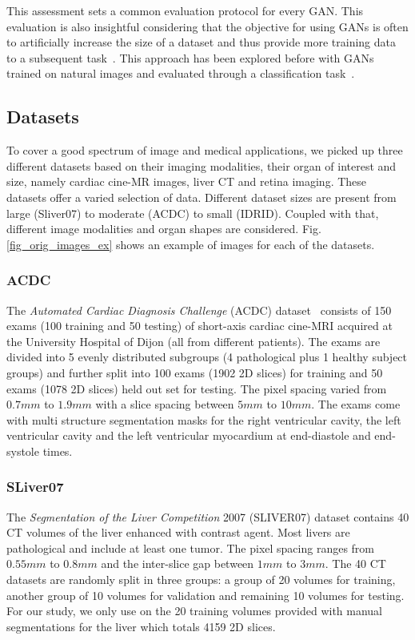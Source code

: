 \documentclass[preprint,12pt, authoryear]{elsarticle}
\begin{document}
This assessment sets a common evaluation protocol for every GAN.  This evaluation is also insightful considering that the objective for using GANs is often to artificially increase the size of a dataset and thus provide more training data to a subsequent task~\citep{Skandarani2020OnTE, Shin2018MedicalIS}. This approach has been explored before with GANs trained on natural images and evaluated through a classification task~\citep{Ravuri2019ClassificationAS,Shmelkov2018HowGI}.

\subsection{Datasets}

To cover a good spectrum of image and medical applications, we picked up three different datasets based on their imaging modalities, their organ of interest and size, namely cardiac cine-MR images, liver CT and retina imaging. These datasets offer a varied selection of data. Different dataset sizes are present from large (Sliver07) to moderate (ACDC) to small (IDRID). Coupled with that, different image modalities and organ shapes are considered. Fig. \ref{fig_orig_images_ex} shows an example of images for each of the datasets.
\subsubsection{ACDC}
The {\em Automated Cardiac Diagnosis Challenge} (ACDC) dataset~\citep{bernard2018deep} consists of 150 exams (100 training and 50 testing) of short-axis cardiac cine-MRI acquired at the University Hospital of Dijon (all from different patients).  The exams are divided into 5 evenly distributed subgroups (4 pathological plus 1 healthy subject groups) and further split into 100 exams (1902 2D slices) for training and 50 exams (1078 2D slices) held out set for testing. The pixel spacing varied from $0.7 mm$ to $1.9 mm$ with a slice spacing between $5 mm$ to $10 mm$. The exams come with multi structure segmentation masks for the right ventricular cavity, the left ventricular cavity and the left ventricular myocardium at end-diastole and end-systole times.
\subsubsection{SLiver07}
The {\em Segmentation of the Liver Competition} 2007 (SLIVER07) \citep{StynerSliver07} dataset contains 40 CT volumes of the liver enhanced with contrast agent.  Most livers are pathological and include at least one tumor. The pixel spacing ranges from $0.55 mm$ to $0.8 mm$ and the inter-slice gap between $1 mm$ to $3 mm$.
The 40 CT datasets are randomly split in three groups: a group of 20 volumes for training, another group of 10 volumes for validation and remaining 10 volumes for testing. For our study, we only use on the 20 training volumes provided with manual segmentations for the liver which totals 4159 2D slices.
\end{document}
